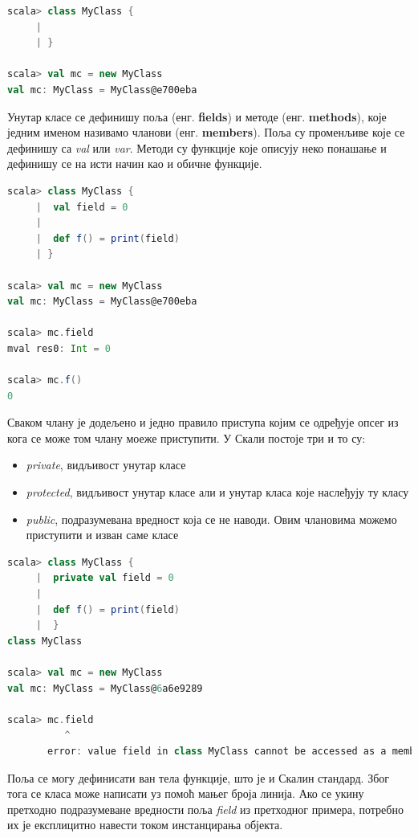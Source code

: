 \documentclass[12pt,oneside]{memoir}
\begin{document}
\begin{lstlisting}[language=Scala]
scala> class MyClass {
     |     
     | }

scala> val mc = new MyClass
val mc: MyClass = MyClass@e700eba
\end{lstlisting}

Унутар класе се дефинишу поља (енг. \textbf{fields}) и методе (енг. \textbf{methods}), које једним именом називамо чланови (енг. \textbf{members}). Поља су променљиве које се дефинишу са \textit{val} или \textit{var}. Методи су функције које описују неко понашање и дефинишу се на исти начин као и обичне функције. \cite{scala_prog}

\begin{lstlisting}[language=Scala]
scala> class MyClass {
     |  val field = 0
     |  
     |  def f() = print(field)
     | }

scala> val mc = new MyClass
val mc: MyClass = MyClass@e700eba

scala> mc.field
mval res0: Int = 0

scala> mc.f()
0
\end{lstlisting}

Сваком члану је додељено и једно правило приступа којим се одређује опсег из кога се може том члану моеже приступити. У Скали постоје три и то су:

\begin{itemize}
\item \textit{private}, видљивост унутар класе
\item \textit{protected}, видљивост унутар класе али и унутар класа које наслеђују ту класу
\item \textit{public}, подразумевана вредност која се не наводи. Овим члановима можемо приступити и изван саме класе
\end{itemize}

\begin{lstlisting}[language=Scala]
scala> class MyClass {
     |  private val field = 0
     |    
     |  def f() = print(field)
     |  }
class MyClass

scala> val mc = new MyClass
val mc: MyClass = MyClass@6a6e9289

scala> mc.field
          ^
       error: value field in class MyClass cannot be accessed as a member of MyClass from class 
\end{lstlisting}

Поља се могу дефинисати ван тела функције, што је и Скалин стандард. Због тога се класа може написати уз помоћ мањег броја линија. Ако се укину претходно подразумеване вредности поља \textit{field} из претходног примера, потребно их је експлицитно навести током инстанцирања објекта.
\end{document}
